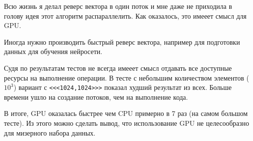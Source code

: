 \documentclass[12pt]{article}
\begin{document}

Всю жизнь я делал реверс вектора в один поток и мне даже не приходила в голову идея
этот алгоритм распараллелить. Как оказалось, это имееет смысл для GPU.

Иногда нужно производить быстрый реверс вектора, например для подготовки данных для
обучения нейросети.

Судя по результатам тестов не всегда имееет смысл отдавать все доступные ресурсы на
выполнение операции. В тесте с небольшим количеством элементов ($10^3$)
вариант с \lstinline|<<<1024,1024>>>| показал худший результат из всех. Больше времени ушло на создание потоков,
чем на выполнение кода.

В итоге, GPU оказалась быстрее чем CPU примерно в 7 раз (на самом большом тесте).
Из этого можно сделать вывод, что использование GPU не целесообразно для мизерного набора данных.
\end{document}
